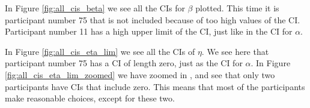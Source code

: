 In Figure \ref{fig:all_cis_beta} we see all the CIs for $\beta$ plotted. This time it is participant number 75 that is not included because of too high values of the CI.  Participant number 11 has a high upper limit of the CI, just like in the CI for $\alpha$.



In Figure \ref{fig:all_cis_eta_lim} we see all the CIs of $\eta$. We see here that participant number 75 has a CI of length zero, just as the CI for $\alpha$. In Figure \ref{fig:all_cis_eta_lim_zoomed} we have zoomed in , and see that only two participants have CIs that include zero. This means that most of the participants make reasonable choices, except for these two. 





